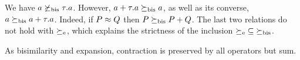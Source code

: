 
\begin{example}
\label{exa:contr}
We have %
 $ a \not  \mathrel{\succeq_{\rm{bis}}} \tau. a$. However,
$a+ \tau . a \mathrel{\succeq_{\rm{bis}}} a$, as well as its converse, 
$  a \mathrel{\succeq_{\rm{bis}}} a +
\tau . a $. Indeed, if $P \approx Q$ then 
$  P  \mathrel{\succeq_{\rm{bis}}} P +Q$. The last two relations do not hold with 
$\mathrel{\succeq_{\rm{e}}}$, which explains the strictness of the inclusion
 ${\mathrel{\succeq_{\rm{e}}}} \subseteq {\mathrel{\succeq_{\rm{bis}}}}$. 
\end{example} 


As  bisimilarity  and expansion, contraction is preserved by all operators but sum.
